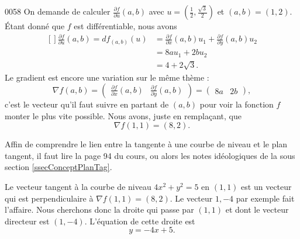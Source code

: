 \begin{corrige}{0058}
On demande de calculer $\frac{ \partial f }{ \partial u }(a,b)$ avec $u=(\frac{ 1 }{2},\frac{ \sqrt{3} }{2})$ et $(a,b)=(1,2)$. Étant donné que $f$ est différentiable, nous avons
\begin{equation}
	\begin{aligned}[]
	\frac{ \partial f }{ \partial u }(a,b)=df_{(a,b)}(u)&=\frac{ \partial f }{ \partial x }(a,b)u_1+\frac{ \partial f }{ \partial y }(a,b)u_2\\
			&=8au_1+2bu_2\\
			&=4+2\sqrt{3}.
	\end{aligned}
\end{equation}
Le gradient est encore une variation sur le même thème :
\begin{equation}
	\nabla f(a,b)=\begin{pmatrix} 
	\frac{ \partial f }{ \partial x }(a,b)	&	\frac{ \partial f }{ \partial y }(a,b)	
\end{pmatrix}=\begin{pmatrix} 
	8a	&	2b	
\end{pmatrix},
\end{equation}
c'est le vecteur qu'il faut suivre en partant de $(a,b)$ pour voir la fonction $f$ monter le plus vite possible. Nous avons, juste en remplaçant, que
\begin{equation}
	\nabla f(1,1)=(8,2).
\end{equation}

Affin de comprendre le lien entre la tangente à une courbe de niveau et le plan tangent, il faut lire la page 94 du cours, ou alors les notes idéologiques de la sous section \ref{ssecConceptPlanTag}. 

Le vecteur tangent à la courbe de niveau $4x^2+y^2=5$ en $(1,1)$ est un vecteur qui est perpendiculaire à $\nabla f(1,1)=(8,2)$. Le vecteur $1,-4$ par exemple fait l'affaire. Nous cherchons donc la droite qui passe par $(1,1)$ et dont le vecteur directeur est $(1,-4)$. L'équation de cette droite est
\begin{equation}
	y=-4x+5.
\end{equation}


\end{corrige}
